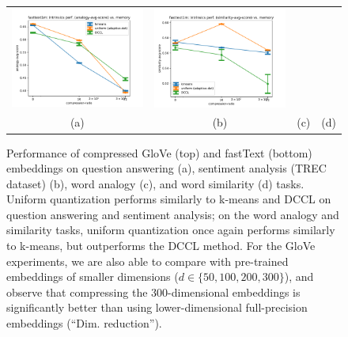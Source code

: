 \begin{figure}
\begin{tabular}{@{\hskip -0.0in}c@{\hskip -0.0in}c@{\hskip -0.0in}c@{\hskip -0.0in}c@{\hskip -0.0in}}
		\includegraphics[width=.245\linewidth]{figures/fasttext1m_intrinsics_analogy-avg-score_vs_compression.pdf} &
		\includegraphics[width=.245\linewidth]{figures/fasttext1m_intrinsics_similarity-avg-score_vs_compression.pdf} \\
		\;\;\;\;\;(a) & \;\;\;\;\;\;(b) & \;\;\;\;\;\;(c) & \;\;\;\;\;\;(d)
	\end{tabular}
\caption{Performance of compressed GloVe (top) and fastText (bottom) embeddings on question answering (a), sentiment analysis (TREC dataset) (b), word analogy (c), and word similarity (d) tasks.
Uniform quantization performs similarly to k-means and DCCL on question answering and sentiment analysis;
on the word analogy and similarity tasks, uniform quantization once again performs similarly to k-means, but outperforms the DCCL method.
For the GloVe experiments, we are also able to compare with pre-trained embeddings of smaller dimensions ($d\in\{50,100,200,300\}$), and observe that compressing the 300-dimensional embeddings is significantly better than using lower-dimensional full-precision embeddings (``Dim. reduction'').
}
\label{fig:comparison_results}
\end{figure}

